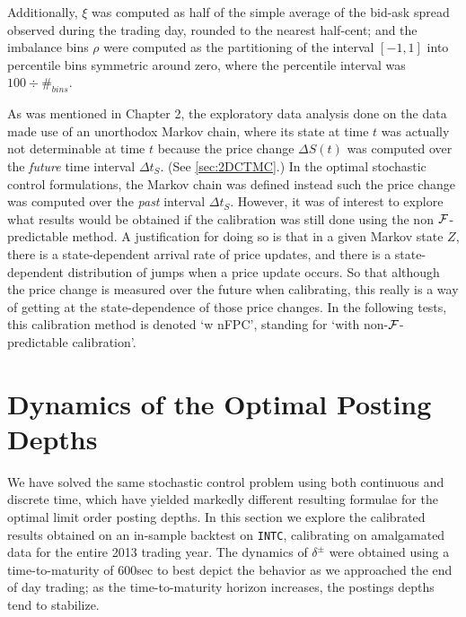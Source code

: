 Additionally, $\xi$ was computed as half of the simple average of the bid-ask spread observed during the trading day, rounded to the nearest half-cent; and the imbalance bins $\rho$ were computed as the partitioning of the interval $[-1,1]$ into percentile bins symmetric around zero, where the percentile interval was $100 \div \#_{bins}$.

As was mentioned in Chapter 2, the exploratory data analysis done on the data made use of an unorthodox Markov chain, where its state at time $t$ was actually not determinable at time $t$ because the price change $\Delta S(t)$ was computed over the \emph{future} time interval $\Delta t_S$. (See \autoref{sec:2DCTMC}.) In the optimal stochastic control formulations, the Markov chain was defined instead such the price change was computed over the \emph{past} interval $\Delta t_S$. However, it was of interest to explore what results would be obtained if the calibration was still done using the non $\mathcal{F}$-predictable method. A justification for doing so is that in a given Markov state $Z$, there is a state-dependent arrival rate of price updates, and there is a state-dependent distribution of jumps when a price update occurs. So that although the price change is measured over the future when calibrating, this really is a way of getting at the state-dependence of those price changes. In the following tests, this calibration method is denoted `w nFPC', standing for `with non-$\mathcal{F}$-predictable calibration'.

\section{Dynamics of the Optimal Posting Depths}

We have solved the same stochastic control problem using both continuous and discrete time, which have yielded markedly different resulting formulae for the optimal limit order posting depths. In this section we explore the calibrated results obtained on an in-sample backtest on \texttt{INTC}, calibrating on amalgamated data for the entire 2013 trading year. The dynamics of $\delta^\pm$ were obtained using a time-to-maturity of 600sec to best depict the behavior as we approached the end of day trading; as the time-to-maturity horizon increases, the postings depths tend to stabilize. 

